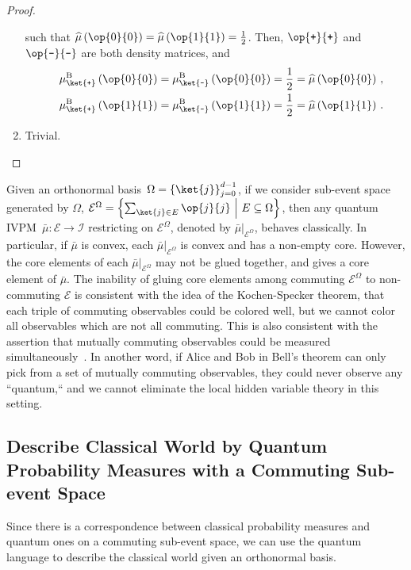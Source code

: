 \documentclass[12pt]{iopart}
\theoremstyle{plain}
\theoremstyle{definition}
\theoremstyle{remark}
\newcommand{\events}{\ensuremath{\mathcal{E}}}
\newcommand{\proj}[1]{\op{#1}{#1}}
\newcommand{\ps}{\texttt{+}}
\newcommand{\minus}{\texttt{-}}
\newcommand{\set}[2]{\ensuremath{\left\{ {#1}~\middle|~{#2}\right\} }}
\begin{document}
\begin{proof}
\begin{enumerate}
such that $\widehat{\mu}\left(\proj{0}\right)=\widehat{\mu}\left(\proj{1}\right)=\frac{1}{2}$.
Then, $\proj{\ps}$ and $\proj{\minus}$ are both density matrices,
and 
\begin{eqnarray*}
 &  & \mu_{\ket{\ps}}^{\mathrm{B}}\left(\proj{0}\right)=\mu_{\ket{\minus}}^{\mathrm{B}}\left(\proj{0}\right)=\frac{1}{2}=\widehat{\mu}\left(\proj{0}\right)\,,\\
 &  & \mu_{\ket{\ps}}^{\mathrm{B}}\left(\proj{1}\right)=\mu_{\ket{\minus}}^{\mathrm{B}}\left(\proj{1}\right)=\frac{1}{2}=\widehat{\mu}\left(\proj{1}\right)\,.
\end{eqnarray*}
\item Trivial.
\end{enumerate}
\end{proof}

Given an orthonormal basis~$\Omega=\left\{ \ket{j}\right\} _{j=0}^{d-1}$,
if we consider sub-event space generated by $\Omega$, $\events^{\Omega}=\set{\sum_{\ket{j}\in E}\proj{j}}{E\subseteq\Omega}$,
then any quantum IVPM~$\bar{\mu}:\events\rightarrow\mathscr{I}$
restricting on $\events^{\Omega}$, denoted by $\bar{\mu}|_{\events^{\Omega}}$,
behaves classically. In particular, if $\bar{\mu}$ is convex, each
$\bar{\mu}|_{\events^{\Omega}}$ is convex and has a non-empty core.
However, the core elements of each $\bar{\mu}|_{\events^{\Omega}}$
may not be glued together, and gives a core element of $\bar{\mu}$.
The inability of gluing core elements among commuting $\events^{\Omega}$
to non-commuting $\events$ is consistent with the idea of the Kochen-Specker
theorem, that each triple of commuting observables could be colored
well, but we cannot color all observables which are not all commuting.
This is also consistent with the assertion that mutually commuting
observables could be measured simultaneously~\cite{Mermin_1993}.
In another word, if Alice and Bob in Bell's theorem can only pick
from a set of mutually commuting observables, they could never observe
any ``quantum,`` and we cannot eliminate the local hidden variable
theory in this setting.

\subsection{Describe Classical World by Quantum Probability Measures with a Commuting
Sub-event Space}

Since there is a correspondence between classical probability measures
and quantum ones on a commuting sub-event space, we can use the quantum
language to describe the classical world given an orthonormal basis.
\end{document}
